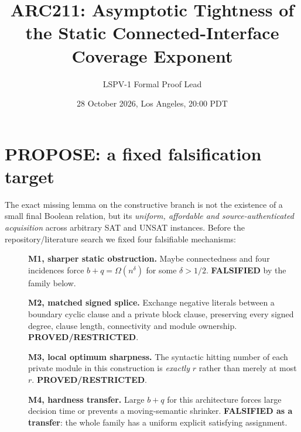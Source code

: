 \documentclass[11pt]{article}
\title{ARC211: Asymptotic Tightness of the Static Connected-Interface Coverage Exponent}
\author{LSPV-1 Formal Proof Lead}
\date{28 October 2026, Los Angeles, 20:00 PDT}
\begin{document}
\maketitle
\begin{center}\end{center}

\section{PROPOSE: a fixed falsification target}
The exact missing lemma on the constructive branch is not the existence of a small final Boolean relation, but its \emph{uniform, affordable and source-authenticated acquisition} across arbitrary SAT and UNSAT instances. Before the repository/literature search we fixed four falsifiable mechanisms:
\begin{description}
\item[] \textbf{M1, sharper static obstruction.} Maybe connectedness and four incidences force $b+q=\Omega(n^\delta)$ for some $\delta>1/2$. \textbf{FALSIFIED} by the family below.
\item[] \textbf{M2, matched signed splice.} Exchange negative literals between a boundary cyclic clause and a private block clause, preserving every signed degree, clause length, connectivity and module ownership. \textbf{PROVED/RESTRICTED}.
\item[] \textbf{M3, local optimum sharpness.} The syntactic hitting number of each private module in this construction is \emph{exactly} $r$ rather than merely at most $r$. \textbf{PROVED/RESTRICTED}.
\item[] \textbf{M4, hardness transfer.} Large $b+q$ for this architecture forces large decision time or prevents a moving-semantic shrinker. \textbf{FALSIFIED as a transfer}: the whole family has a uniform explicit satisfying assignment.
\end{description}
\end{document}
